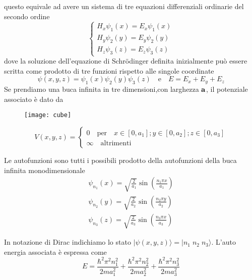 questo equivale ad avere un sistema di tre equazioni differenziali ordinarie del secondo ordine
\newpage 
\begin{equation*}
	\left \{ \begin{array}{l}
		H_x \psi_1(x) = E_x \psi_1(x)\\[0.3cm]
		H_y \psi_2(y) = E_y\psi_2(y) \\[0.3cm]
		H_z \psi_3(z) = E_z \psi_3(z)
	\end{array}\right. 
\end{equation*}
dove la soluzione dell'equazione di Schr\"odinger definita inizialmente pu\`o essere scritta come prodotto di tre funzioni rispetto alle singole coordinate
\begin{equation*}
	\psi(x,y,z) = \psi_1(x)\psi_2(y)\psi_3(z) \quad \text{e} \quad E = E_x + E_y + E_z
\end{equation*}
Se prendiamo una buca infinita in tre dimensioni,con larghezza $\bold{a}$, il potenziale associato \`e dato da 
\begin{wrapfigure}{r}{0.4\textwidth} %
    \centering
    \texttt{[image: cube]} %
\end{wrapfigure}

\begin{equation*}
	V(x,y,z) = \left \{ \begin{array}{l}
		0 \quad \text{per} \quad x \in [0,a_1]; y\in [0,a_2]; z \in [0,a_3] \\[0.3cm]
		\infty \quad \text{altrimenti}
	\end{array}\right.
\end{equation*}


\noindent Le autofunzioni sono tutti i possibili prodotto della autofunzioni della buca infinita monodimensionale
\begin{align*}
\psi_{n_1}(x) = \sqrt{\frac{2}{a_1} } \sin \left( \frac{n_1 \pi x}{a_1} \right)\\[0.5cm]
\psi_{n_2}(y) = \sqrt{\frac{2}{a_2}} \sin \left ( \frac{n_2\pi y}{a_2}\right) \\[0.5cm]
\psi_{n_3}(z) = \sqrt{\frac{2}{a_3}}\sin \left( \frac{n_3 \pi x}{a_3}\right)
\end{align*}

In notazione di Dirac indichiamo lo stato $|\psi(x,y,z) \rangle = |n_1 \; n_2 \; n_3 \rangle  $. L'auto energia associata \`e espressa come 
\begin{equation*}
	E = \frac{\hbar^2 \pi^2 n_1^2}{2ma_1^2} + \frac{\hbar^2 \pi^2 n_2^2}{2ma_2^2} + \frac{\hbar^2 \pi^2 n_3^2}{2ma_3^2}
\end{equation*}

